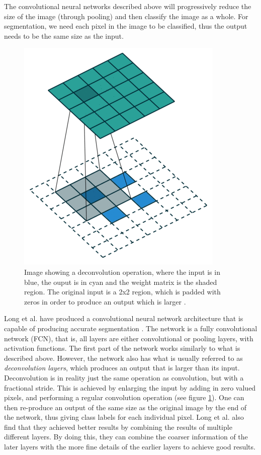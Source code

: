 The convolutional neural networks described above will progressively reduce the size of the image (through pooling) and then classify the image as a whole. For segmentation, we need each pixel in the image to be classified, thus the output needs to be the same size as the input. 


\begin{figure}[h!]
\centering
\includegraphics[scale=0.45]{pictures/deConv}
\caption{Image showing a deconvolution operation, where the input is in blue, the ouput is in cyan and the weight matrix is the shaded region. The original input is a 2x2 region, which is padded with zeros in order to produce an output which is larger \cite{convPics}.}
\label{fig:deConv}
\end{figure}

Long et al. have produced a convolutional neural network architecture that is capable of producing accurate segmentation \cite{fcn}. The network is a fully convolutional network (FCN), that is, all layers are either convolutional or pooling layers, with activation functions. The first part of the network works similarly to what is described above. However, the network also has what is usually referred to as \textit{deconvolution layers}, which produces an output that is larger than its input. Deconvolution is in reality just the same operation as convolution, but with a fractional stride. This is  achieved by enlarging the input by adding in zero valued pixels, and performing a regular convolution operation (see figure \ref{fig:deConv}). One can then re-produce an output of the same size as the original image by the end of the network, thus giving class labels for each individual pixel. Long et al. also find that they achieved better results by combining the results of multiple different layers. By doing this, they can combine the coarser information of the later layers with the more fine details of the earlier layers to achieve good results.

